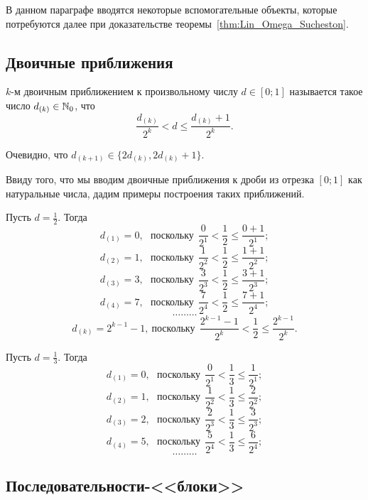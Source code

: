 В данном параграфе вводятся некоторые вспомогательные объекты,
которые потребуются далее при доказательстве теоремы~\ref{thm:Lin_Omega_Sucheston}.

\subsection{Двоичные приближения}

\begin{definition}
	$k$-м двоичным приближением к произвольному числу $d\in[0;1]$
	называется такое число $d_{(k)}\in\mathbb{N}_0$,
	что
	\begin{equation}
		\label{eq:binary_approximations_for_number}
		\frac{d_{(k)}}{2^k} < d \leq \frac{d_{(k)}+1}{2^k}
		.
	\end{equation}
\end{definition}

\begin{remark}
	Очевидно, что $d_{(k+1)}\in\{2d_{(k)},2d_{(k)}+1\}$.
\end{remark}

Ввиду того, что мы вводим двоичные приближения к дроби из отрезка $[0;1]$ как натуральные числа,
дадим примеры построения таких приближений.

\begin{example}
	Пусть $d=\frac12$.
	Тогда
	$$
		d_{(1)} = 0, ~~~\mbox{поскольку}~~ \frac{0}{2^1} < \frac12 \leq \frac{0+1}{2^1};
	$$
	$$
		d_{(2)} = 1, ~~~\mbox{поскольку}~~ \frac{1}{2^2} < \frac12 \leq \frac{1+1}{2^2};
	$$
	$$
		d_{(3)} = 3, ~~~\mbox{поскольку}~~ \frac{3}{2^3} < \frac12 \leq \frac{3+1}{2^3};
	$$
	$$
		d_{(4)} = 7, ~~~\mbox{поскольку}~~ \frac{7}{2^4} < \frac12 \leq \frac{7+1}{2^4};
	$$
	$$
		\dots\dots\dots
	$$
	$$
		d_{(k)} = 2^{k-1}-1, ~\mbox{поскольку}~~ \frac{2^{k-1}-1}{2^k} < \frac12 \leq \frac{2^{k-1}}{2^k}.
	$$
\end{example}

\begin{example}
	Пусть $d=\frac13$.
	Тогда
	$$
		d_{(1)} = 0, ~~~\mbox{поскольку}~~ \frac{0}{2^1} < \frac13 \leq \frac{1}{2^1};
	$$
	$$
		d_{(2)} = 1, ~~~\mbox{поскольку}~~ \frac{1}{2^2} < \frac13 \leq \frac{2}{2^2};
	$$
	$$
		d_{(3)} = 2, ~~~\mbox{поскольку}~~ \frac{2}{2^3} < \frac13 \leq \frac{3}{2^3};
	$$
	$$
		d_{(4)} = 5, ~~~\mbox{поскольку}~~ \frac{5}{2^4} < \frac13 \leq \frac{6}{2^4};
	$$
	$$
		\dots\dots\dots
	$$
\end{example}


\subsection{Последовательности-<<блоки>>}

